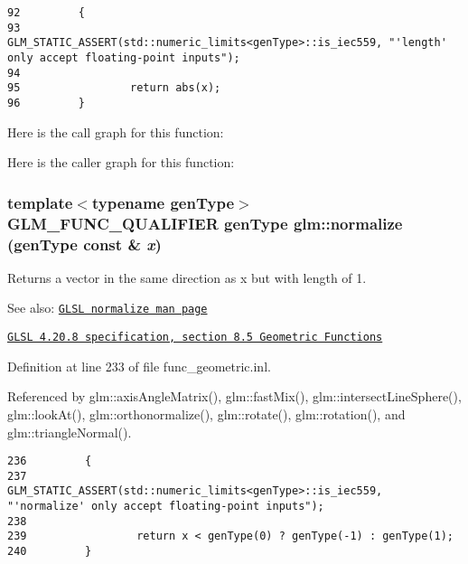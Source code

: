 \begin{Code}\begin{verbatim}92         {
93                 GLM_STATIC_ASSERT(std::numeric_limits<genType>::is_iec559, "'length' only accept floating-point inputs");
94 
95                 return abs(x);
96         }
\end{verbatim}
\end{Code}




Here is the call graph for this function:

Here is the caller graph for this function:\hypertarget{group__core__func__geometric_g0feb2bb89ee2743677ad2cb84544bd83}{
\subsubsection[normalize]{\setlength{\rightskip}{0pt plus 5cm}template$<$typename genType$>$ GLM\_\-FUNC\_\-QUALIFIER genType glm::normalize (genType const \& {\em x})}}
\label{group__core__func__geometric_g0feb2bb89ee2743677ad2cb84544bd83}


Returns a vector in the same direction as x but with length of 1.

\begin{Desc}
\item[See also:]\href{http://www.opengl.org/sdk/docs/manglsl/xhtml/normalize.xml}{\tt GLSL normalize man page} 

\href{http://www.opengl.org/registry/doc/GLSLangSpec.4.20.8.pdf}{\tt GLSL 4.20.8 specification, section 8.5 Geometric Functions} \end{Desc}


Definition at line 233 of file func\_\-geometric.inl.

Referenced by glm::axisAngleMatrix(), glm::fastMix(), glm::intersectLineSphere(), glm::lookAt(), glm::orthonormalize(), glm::rotate(), glm::rotation(), and glm::triangleNormal().

\begin{Code}\begin{verbatim}236         {
237                 GLM_STATIC_ASSERT(std::numeric_limits<genType>::is_iec559, "'normalize' only accept floating-point inputs");
238 
239                 return x < genType(0) ? genType(-1) : genType(1);
240         }
\end{verbatim}
\end{Code}




